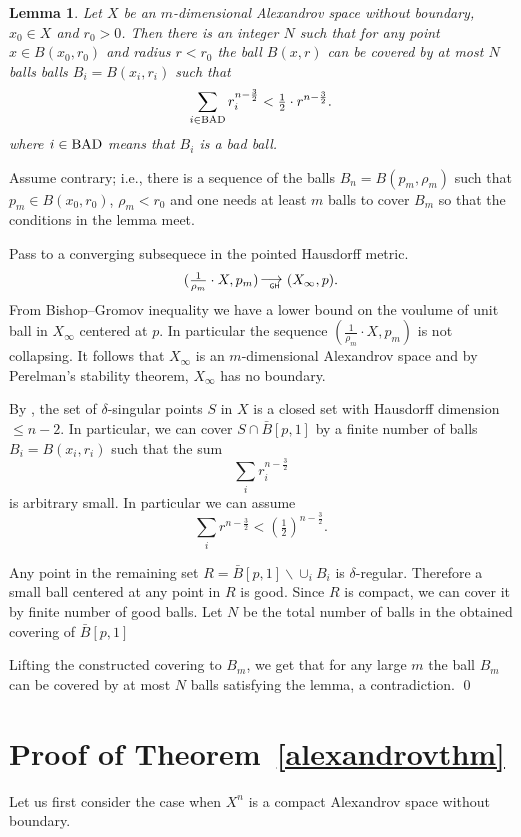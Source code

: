 \documentclass[12pt,leqno,intlimits]{amsart}
\numberwithin{equation}{section}
\newtheorem{lem}[thm]{Lemma}
\theoremstyle{definition}
\theoremstyle{remark}
\def\BAD{\mathop{\rm BAD}\nolimits}%
\newcommand*{\GHto}{\mathbin{\begin{picture}(16,3.5)
\put(-1,1){$\longrightarrow$}
\put(13,-3){\llap{\text{\sf\tiny GH}}}
\end{picture}}}
\def\parit#1{\medskip\noindent{\it #1}}
\def\qeds{\qed\par\medskip}
\begin{document}
\begin{lem}\label{lem:covering}
Let $X$ be an $m$-dimensional Alexandrov space without boundary,
$x_0\in X$
and $r_0>0$.
Then there is an integer $N$ such that for any point $x\in B(x_0,r_0)$ and radius $r<r_0$
the ball $B(x,r)$ can be covered by at most $N$ balls
balls $B_i=B(x_i,r_i)$ such that
$$\sum_{i\in \BAD}r_i^{n-\frac32}< \tfrac12\cdot r^{n-\frac32}.$$
where $i\in \BAD$ means that $B_i$ is a bad ball.

\end{lem}

\parit{Proof.}
Assume contrary;
i.e., there is a sequence of the balls
$B_n=B(p_m,\rho_m)$
such that $p_m\in B(x_0,r_0)$,
$\rho_m<r_0$ and
one needs at least $m$ balls to cover $B_m$ so that the conditions in the lemma meet.

Pass to a converging subsequece in the pointed Hausdorff metric.
$$(\tfrac1{\rho_m}\cdot X,p_m)\GHto (X_\infty,p).$$
From Bishop--Gromov inequality we have a lower bound on the voulume of unit ball in $X_\infty$ centered at $p$.
In particular the sequence $(\tfrac1{\rho_m}\cdot X,p_m)$
is not collapsing.
It follows that $X_\infty$ is an $m$-dimensional Alexandrov space
and by Perelman's stability theorem, $X_\infty$ has no boundary.

By \cite{BGP}, the set of $\delta$-singular points $S$ in $X$
is a closed set with Hausdorff dimension $\le n-2$.
In particular, we can cover $S\cap \bar B[p,1]$ by a finite number of balls
$B_i=B(x_i,r_i)$ such that the sum
$$\sum_ir_i^{n-\frac32}$$
is arbitrary small.
In particular we can assume
$$\sum_ir^{n-\frac32}<(\tfrac12)^{n-\frac32}.$$

Any point in the remaining set $R=\bar B[p,1]\backslash \cup_i B_i$
is $\delta$-regular.
Therefore a small ball centered at any point in $R$ is good.
Since $R$ is compact,
we can cover it by finite number of good balls.
Let $N$ be the total number of balls in the obtained covering of $\bar B[p,1]$

Lifting the constructed covering to $B_m$,
we get that for any large $m$
the ball $B_m$ can be covered by at most $N$ balls satisfying the lemma,
a contradiction.
\qeds

\section{Proof of Theorem~\ref{alexandrovthm}}

\parit{Proof.}

Let us first consider the case when $X^n$ is a compact Alexandrov space   without boundary.
\end{document}

